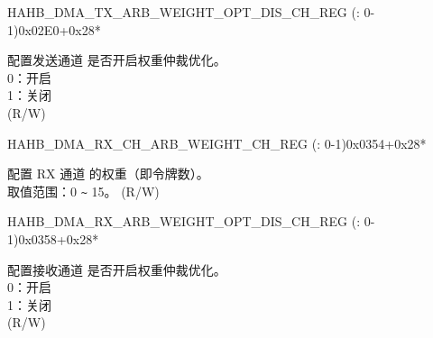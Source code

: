 \begin{register}{H}{AHB\_DMA\_TX\_ARB\_WEIGHT\_OPT\_DIS\_CH\_REG (: 0-1)}{0x02E0+0x28*}\label{regdesc:AHBDMATXARBWEIGHTOPTDISCHNREG}
%
%
\regnewline%
\begin{regdesc}\begin{reglist}
\label{fielddesc:AHBDMATXARBWEIGHTOPTDISCHN}\item [AHB\_DMA\_TX\_ARB\_WEIGHT\_OPT\_DIS\_CH\regindex{n}] 配置发送通道  是否开启权重仲裁优化。\\
0：开启\\
1：关闭\\ (R/W)
\end{reglist}\end{regdesc}
\end{register}


\begin{register}{H}{AHB\_DMA\_RX\_CH\_ARB\_WEIGHT\_CH\_REG (: 0-1)}{0x0354+0x28*}\label{regdesc:AHBDMARXCHARBWEIGHTCHNREG}
%
%
\regnewline%
\begin{regdesc}\begin{reglist}
\label{fielddesc:AHBDMARXCHARBWEIGHTCHN}\item [AHB\_DMA\_RX\_CH\_ARB\_WEIGHT\_CH\regindex{n}] 配置 RX 通道  的权重（即令牌数）。\\取值范围：0 \verb+~+ 15。 (R/W)
\end{reglist}\end{regdesc}
\end{register}


\begin{register}{H}{AHB\_DMA\_RX\_ARB\_WEIGHT\_OPT\_DIS\_CH\_REG (: 0-1)}{0x0358+0x28*}\label{regdesc:AHBDMARXARBWEIGHTOPTDISCHNREG}
%
%
\regnewline%
\begin{regdesc}\begin{reglist}
\label{fielddesc:AHBDMARXARBWEIGHTOPTDISCHN}\item [AHB\_DMA\_RX\_ARB\_WEIGHT\_OPT\_DIS\_CH\regindex{n}] 配置接收通道  是否开启权重仲裁优化。\\
0：开启\\
1：关闭\\ (R/W)
\end{reglist}\end{regdesc}
\end{register}


